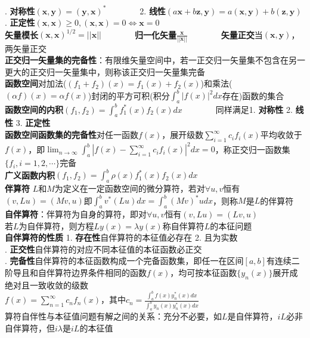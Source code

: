 \documentclass[10pt,a4paper]{article}
\begin{document}
\begin{multicols}{2}
. \textbf{对称性}$(\bm{x},\bm{y})=(\bm{y},\bm{x})^*$~~~~~~~~2. \textbf{线性}$(a\bm{x}+b\bm{z},\bm{y})=a(\bm{x},\bm{y})+b(\bm{z},\bm{y})$\\
. \textbf{正定性}$(\bm{x},\bm{x})\geq0,(\bm{x},\bm{x})=0\Leftrightarrow\bm{x}=0$\\
\textbf{矢量模长}$(\bm{x},\bm{x})^{1/2}=||\bm{x}||$~~~~~~~~\textbf{归一化矢量}$\frac{\bm{x}}{||\bm{x}||}$~~~~~~~~\textbf{矢量正交}当$(\bm{x},\bm{y})$，两矢量正交\\
\textbf{正交归一矢量集的完备性}：有限维矢量空间中，若一正交归一矢量集不包含在另一更大的正交归一矢量集中，则称该正交归一矢量集完备\\
\textbf{函数空间}对加法($(f_1+f_2)(x)=f_1(x)+f_2(x)$)和乘法($(\alpha f)(x)=\alpha f(x)$)封闭的平方可积(积分$\int_a^b|f(x)|^2dx$存在)函数的集合\\
\textbf{函数空间的内积}$(f_1,f_2)=\int_a^bf_1^*(x)f_2(x)dx$~~~~~~~~同样满足1. \textbf{对称性} 2. \textbf{线性} 3. \textbf{正定性}\\
\textbf{函数空间函数集的完备性}对任一函数$f(x)$，展开级数$\sum_{i=1}^{\infty}c_if_i(x)$平均收敛于$f(x)$，即$\lim_{n\to\infty}\int_a^b|f(x)-\sum_{i=1}^{\infty}c_if_i(x)|^2dx=0$，称正交归一函数集$\{f_i,i=1,2,\cdots\}$完备\scriptsize\\
\textbf{广义函数内积}$(f_1,f_2)=\int_a^b\rho(x)f_1^*(x)f_2(x)dx$\\
\textbf{伴算符} $L$和$M$为定义在一定函数空间的微分算符，若对$\forall u,v$恒有$(v,Lu)=(Mv,u)$即$\int_a^bv^*(Lu)dx=\int_a^b(Mv)^*udx$，则称$M$是$L$的伴算符\\
\textbf{自伴算符}：伴算符为自身的算符，即对$\forall u,v$恒有$(v,Lu)=(Lv,u)$\\
若$L$为自伴算符，则方程$Ly(x)=\lambda y(x)$称自伴算符$L$的本征问题\\
\textbf{自伴算符的性质} 1. \textbf{存在性}自伴算符的本征值必存在 2. 且为实数\\
. \textbf{正交性}自伴算符的对应不同本征值的本征函数必正交\\
. \textbf{完备性}自伴算符的本征函数构成一个完备函数集，即任一在区间$[a,b]$有连续二阶导且和自伴算符边界条件相同的函数$f(x)$，均可按本征函数$\{y_n(x)\}$展开成绝对且一致收敛的级数\\
\indent$f(x)=\sum_{n=1}^{\infty}c_nf_n(x)$，其中$c_n=\frac{\int_a^bf(x)y_n^*(x)dx}{\int_a^by_n(x)y_n^*(x)dx}$\\
算符自伴性与本征值问题有解之间的关系：充分不必要，如$L$是自伴算符，$iL$必非自伴算符，但$i\lambda$是$iL$的本征值\\

\end{multicols}
\end{document}

